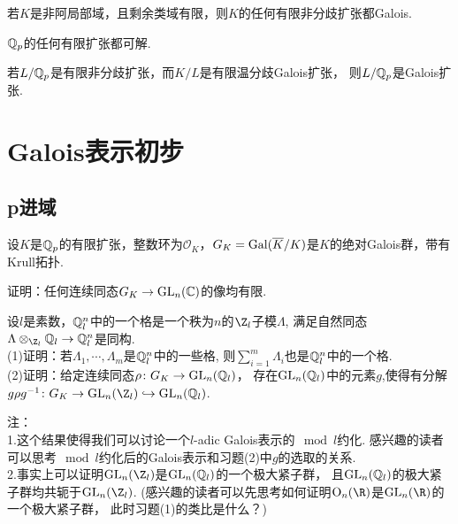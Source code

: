 \begin{exercise}
    若$K$是非阿局部域，且剩余类域有限，则$K$的任何有限非分歧扩张都Galois.
\end{exercise}

\begin{exercise}
    $\mathbb{Q}_{p}$的任何有限扩张都可解.
\end{exercise}

\begin{exercise}
    若$L/\mathbb{Q}_{p}$是有限非分歧扩张，而$K/L$是有限温分歧Galois扩张，
    则$L/\mathbb{Q}_{p}$是Galois扩张.
\end{exercise}

\section{Galois表示初步}
\subsection{p进域}
设$K$是$\mathbb{Q}_p$的有限扩张，整数环为$\mathcal{O}_K$，$G_K=\operatorname{Gal}(\overline{K}/K)$是$K$的绝对Galois群，带有Krull拓扑.
\begin{exercise}
证明：任何连续同态$G_K\rightarrow\mathrm{GL}_n(\mathbb{C})$的像均有限.
\end{exercise}

\begin{exercise}
设$l$是素数，$\mathbb{Q}_l^n$中的一个格是一个秩为$n$的$\Z_l$子模$\Lambda$,
满足自然同态$\Lambda\otimes_{\Z_l}\Q_l\rightarrow \Q_l^n$是同构.\\
(1)证明：若$\Lambda_1,\cdots,\Lambda_m$是$\mathbb{Q}_l^n$中的一些格,
则$\sum_{i=1}^{m}\Lambda_i$也是$\mathbb{Q}_l^n$中的一个格.\\
(2)证明：给定连续同态$\rho\colon G_K\rightarrow\mathrm{GL}_n(\mathbb{Q}_l)$，
存在$\mathrm{GL}_n(\mathbb{Q}_l)$中的元素$g$,使得有分解
$g\rho g^{-1}\colon G_K\rightarrow\GL_n(\Z_l)\hookrightarrow\GL_n(\Q_l)$.

注：\\
1.这个结果使得我们可以讨论一个$l$-adic Galois表示的$\mod l$约化.
感兴趣的读者可以思考$\mod l$约化后的Galois表示和习题(2)中$g$的选取的关系.\\
2.事实上可以证明$\GL_n(\Z_l)$是$\mathrm{GL}_n(\mathbb{Q}_l)$的一个极大紧子群，
且$\mathrm{GL}_n(\mathbb{Q}_l)$的极大紧子群均共轭于$\GL_n(\Z_l)$.
(感兴趣的读者可以先思考如何证明$\mathrm{O}_n(\R)$是$\GL_n(\R)$的一个极大紧子群，
此时习题(1)的类比是什么？)

\end{exercise}

